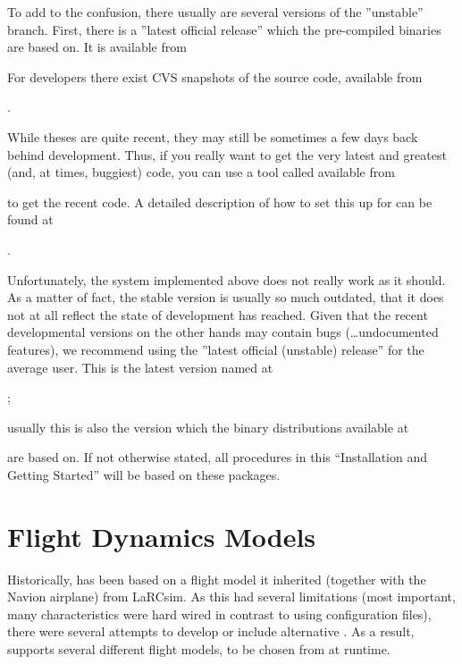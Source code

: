 To add to the confusion, there usually are several versions of the ''unstable''
branch. First, there is a ''latest official release'' which the pre-compiled binaries are based
on.  It is available from
\medskip

\medskip

For developers there exist CVS snapshots of the
source code, available from
 \medskip

.
 \medskip

 \noindent
While theses are quite recent, they may still be sometimes a few days back behind
development. Thus, if you really want to get the very latest and greatest (and, at times,
buggiest) code, you can use a tool called 
available from
 \medskip

 \medskip

 \noindent
to get the recent code. A detailed description of how to set this up for \FlightGear{}
can be found at
 \medskip

.
 \medskip

 \noindent
 Unfortunately, the system implemented above does not really work as it should. As a matter of
 fact, the stable version is usually so much outdated, that it does not at all reflect the state
 of development \FlightGear{} has reached. Given that the recent developmental versions on the
 other hands may contain bugs (\ldots undocumented features), we recommend using the
 ''latest official (unstable) release'' for the average user. This is the latest version named at

 ;
 \medskip

\noindent
 usually this is also the version which the binary distributions
 available at
 \medskip

 \medskip

 \noindent
 are based on. If not otherwise stated, all procedures in this ``Installation and Getting Started''
 will be based on these packages.

\section{Flight Dynamics Models\label{flight models}}
Historically, \FlightGear{} has been based on a flight model it inherited (together
with the Navion airplane) from LaRCsim. As this had several limitations (most important,
many characteristics were hard wired in contrast to using configuration files), there were
several attempts to develop or include alternative . As a result,
\FlightGear{} supports several different flight models, to be chosen from at runtime.

